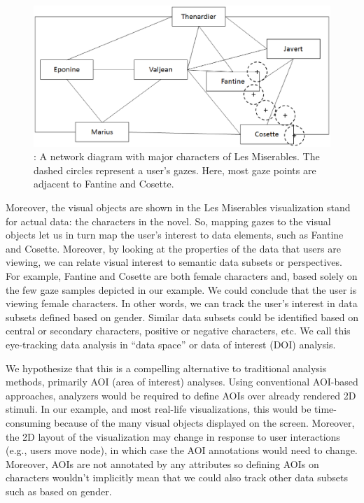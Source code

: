 \begin{figure}[htb]
  \centering
  \includegraphics[width=0.99\linewidth]{images/MiserablesSimple.eps}
  \caption{: A network diagram with major characters of Les Miserables. The dashed circles represent a user's gazes. Here, most gaze points are adjacent to Fantine and Cosette. }
    \label{fig:MiserablesSimple}
\end{figure}

Moreover, the visual objects are shown in the Les Miserables visualization stand for actual data: the characters in the novel. So, mapping gazes to the visual objects let us in turn map the user's interest to data elements, such as Fantine and Cosette. Moreover, by looking at the properties of the data that users are viewing, we can relate visual interest to semantic data subsets or perspectives. For example, Fantine and Cosette are both female characters and, based solely on the few gaze samples depicted in our example. We could conclude that the user is viewing female characters. In other words, we can track the user's interest in data subsets defined based on gender. Similar data subsets could be identified based on central or secondary characters, positive or negative characters, etc. We call this eye-tracking data analysis in ``data space'' or data of interest (DOI) analysis.

We hypothesize that this is a compelling alternative to traditional analysis methods, primarily AOI (area of interest) analyses. Using conventional AOI-based approaches, analyzers would be required to define AOIs over already rendered 2D stimuli. In our example, and most real-life visualizations, this would be time-consuming because of the many visual objects displayed on the screen. Moreover, the 2D layout of the visualization may change in response to user interactions (e.g., users move node), in which case the AOI annotations would need to change. Moreover, AOIs are not annotated by any attributes so defining AOIs on characters wouldn't implicitly mean that we could also track other data subsets such as based on gender.  

